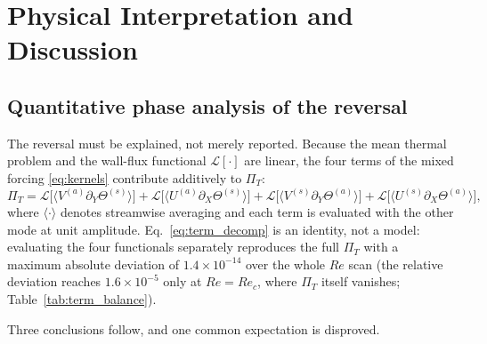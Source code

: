 \documentclass[12pt,a4paper]{article}
\newcommand{\Rey}{\mathit{Re}}
\newcommand{\PiT}{\Pi_T}
\begin{document}
\section{Physical Interpretation and Discussion}
\label{sec:discussion}

\subsection{Quantitative phase analysis of the reversal}
\label{sec:phase_analysis}

The reversal must be explained, not merely reported. Because the mean thermal problem
and the wall-flux functional $\mathcal L[\cdot]$ are linear, the four terms of the mixed
forcing \eqref{eq:kernels} contribute additively to $\PiT$:
\begin{equation}
  \PiT=\mathcal L\!\big[\langle V^{(a)}\partial_Y\Theta^{(s)}\rangle\big]
       +\mathcal L\!\big[\langle U^{(a)}\partial_X\Theta^{(s)}\rangle\big]
       +\mathcal L\!\big[\langle V^{(s)}\partial_Y\Theta^{(a)}\rangle\big]
       +\mathcal L\!\big[\langle U^{(s)}\partial_X\Theta^{(a)}\rangle\big],
  \label{eq:term_decomp}
\end{equation}
where $\langle\cdot\rangle$ denotes streamwise averaging and each term is evaluated with
the other mode at unit amplitude. Eq.~\eqref{eq:term_decomp} is an identity, not a
model: evaluating the four functionals separately reproduces the full $\PiT$ with a
maximum absolute deviation of $1.4\times10^{-14}$ over the whole $\Rey$ scan
(the relative deviation reaches $1.6\times10^{-5}$ only at $\Rey=\Rey_c$, where
$\PiT$ itself vanishes; Table~\ref{tab:term_balance}).

Three conclusions follow, and one common expectation is disproved.
\end{document}

